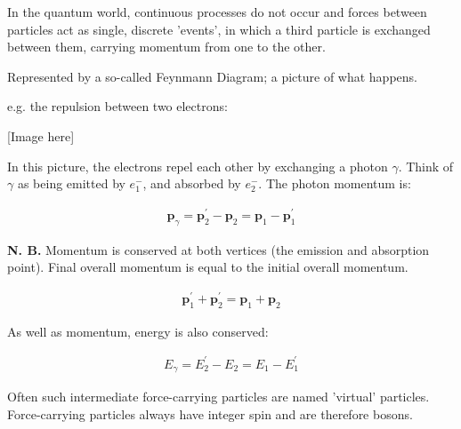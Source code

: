 \documentclass[10pt,a4paper]{article}
\begin{document}
In the quantum world, continuous processes do not occur and forces between particles act as single, discrete 'events', in which a third particle is exchanged between them, carrying momentum from one to the other.

Represented by a so-called Feynmann Diagram; a picture of what happens.

e.g. the repulsion between two electrons:

[Image here]

In this picture, the electrons repel each other by exchanging a photon $\gamma$. Think of $\gamma$ as being emitted by $e_{1}^{-}$, and absorbed by $e_{2}^{-}$. The photon momentum is:

\begin{align*}
\textbf{p}_{\gamma} = \textbf{p}_{2}^{\prime} -  \textbf{p}_{2} =  \textbf{p}_{1} -  \textbf{p}_{1}^{\prime}
\end{align*}

\textbf{N. B.} Momentum is conserved at both vertices (the emission and absorption point). Final overall momentum is equal to the initial overall momentum.

\begin{align*}
\textbf{p}_{1}^{\prime} + \textbf{p}_{2}^{\prime} = \textbf{p}_{1} + \textbf{p}_{2}
\end{align*}

As well as momentum, energy is also conserved:

\begin{align*}
E_{\gamma} = E_{2}^{\prime} - E_{2} = E_{1} - E_{1}^{\prime}
\end{align*}

Often such intermediate force-carrying particles are named 'virtual' particles. Force-carrying particles always have integer spin and are therefore bosons.
\end{document}
